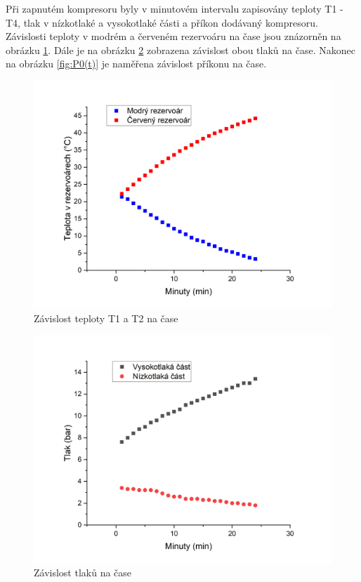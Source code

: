 Při zapnutém kompresoru byly v minutovém intervalu zapisovány teploty T1 - T4, tlak v nízkotlaké a vysokotlaké části a příkon dodávaný kompresoru. Závislosti teploty v modrém a červeném rezervoáru na čase jsou znázorněn na obrázku \ref{fig:T1(t),T2(t)}. Dále je na obrázku \ref{fig:P(t)} zobrazena závislost obou tlaků na čase. Nakonec na obrázku \ref{fig:P0(t)} je naměřena závislost příkonu na čase.

\newpage

\begin{figure}[h]
    \centering
    \includegraphics[width=0.68\linewidth]{27 - Tepelné čerpadlo//Protokol_tepelné čerpadlo//img/T1(t), T2(t) zap.png}
    \caption{Závislost teploty T1 a T2 na čase}
    \label{fig:T1(t),T2(t)}
\end{figure}

\begin{figure}[h]
    \centering
    \includegraphics[width=0.68\linewidth]{27 - Tepelné čerpadlo//Protokol_tepelné čerpadlo//img/P(t) zap.png}
    \caption{Závislost tlaků na čase}
    \label{fig:P(t)}
\end{figure}

\newpage

